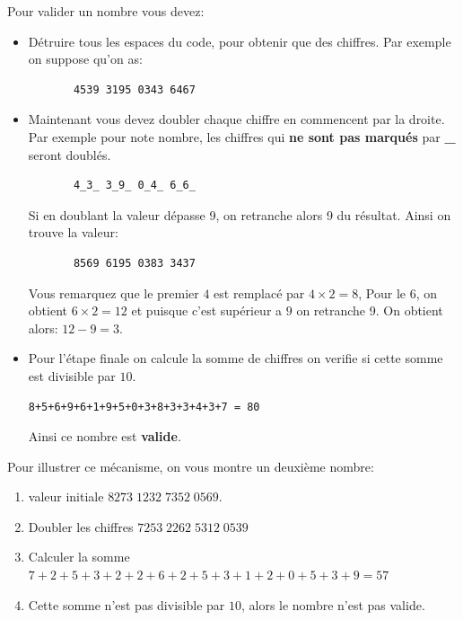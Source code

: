 \documentclass[palatino,code]{ensaexam}
\begin{document}
\begin{questions}

  Pour valider un nombre vous devez:

  \begin{itemize}
    \item Détruire tous les espaces du code, pour obtenir que des chiffres. Par
      exemple on suppose qu'on as:
      \begin{verbatim}
       4539 3195 0343 6467 
      \end{verbatim}
    \item Maintenant vous devez doubler chaque chiffre en commencent par la
      droite. Par exemple pour note nombre,  les chiffres qui \textbf{ne sont
      pas marqués} par \textbf{\_} seront doublés.  

      \begin{verbatim}
       4_3_ 3_9_ 0_4_ 6_6_
      \end{verbatim}
      Si en doublant la valeur dépasse 9, on retranche alors 9 du résultat.
      Ainsi on trouve la valeur:
      \begin{verbatim}
       8569 6195 0383 3437
      \end{verbatim}
      Vous remarquez que le premier $4$ est remplacé par $4\times 2 = 8$, Pour
      le $6$, on obtient $6\times2 = 12$ et puisque c'est supérieur a $9$ on
      retranche 9. On obtient alors: $12 - 9 = 3$.
    \item Pour l'étape finale on calcule la somme de chiffres on verifie si
      cette somme est divisible par $10$.
      \begin{verbatim}
8+5+6+9+6+1+9+5+0+3+8+3+3+4+3+7 = 80
      \end{verbatim}
      Ainsi ce nombre est \textbf{valide}.
  \end{itemize}
  
  Pour illustrer ce mécanisme, on vous montre un deuxième nombre:
  \begin{enumerate}
    \item valeur initiale $8273\;1232\;7352\;0569$.
    \item Doubler les chiffres $7253\;2262\;5312\;0539$
    \item Calculer la somme $7+2+5+3+2+2+6+2+5+3+1+2+0+5+3+9 = 57$
    \item Cette somme n'est pas divisible par $10$, alors le nombre n'est pas
      valide.
  \end{enumerate}

  
 \end{questions}
 
 
\end{document}
